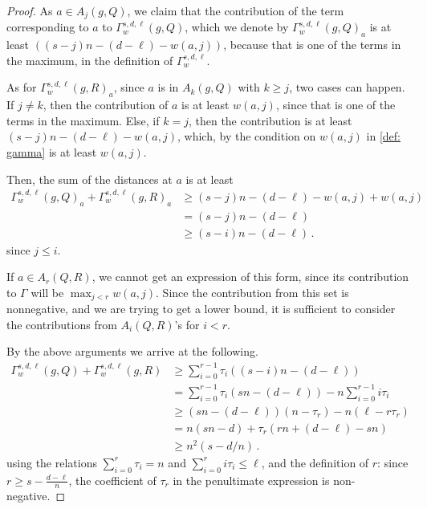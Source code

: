 \documentclass{theoretics}
\begin{document}
\begin{proof}
		As $a \in A_j(g, Q)$, we claim that the contribution of the term corresponding to $a$ to $\Gamma_w^{s,d,\ell}(g, Q)$, which we denote by $\Gamma_w^{s,d,\ell}(g, Q)_a$ is at least $\left((s-j)n - (d-\ell) - w(a, j)\right)$, because that is one of the terms in the maximum, in the definition of $\Gamma_w^{s,d,\ell}$.
		
		As for $\Gamma_w^{s,d,\ell}(g, R)_a$, since $a$ is in $A_k(g, Q)$ with $k \geq j$, two cases can happen. If $j \neq k$, then the contribution of $a$ is at least $w(a, j)$, since that is one of the terms in the maximum. Else, if $k = j$, then the contribution is at least $(s-j)n - (d-\ell) - w(a, j)$, which, by the condition on $w(a,j)$ in \cref{def: gamma} is at least $w(a,j)$.
		
		Then, the sum of the distances at $a$ is at least 
		\[ \begin{split}
			\Gamma_w^{s,d,\ell}(g, Q)_a + \Gamma_w^{s,d,\ell}(g, R)_a & \geq (s-j)n - (d-\ell) - w(a, j) + w(a, j) \\
			& = (s-j)n - (d-\ell) \\ 
			& \geq (s-i)n - (d-\ell) \, .
		\end{split} \]
		since $j \leq i$.
		
		If $a \in A_r(Q, R)$, we cannot get an expression of this form, since its contribution to $\Gamma$ will be $\max_{j < r} w(a, j)$. Since the contribution from this set is nonnegative, and we are trying to get a lower bound, it is sufficient to consider the contributions from $A_i(Q, R)$'s for $i < r$. 
		
		By the above arguments we arrive at the following.
		\[  
		\begin{split}
			\Gamma_w^{s,d,\ell}(g, Q) + \Gamma_w^{s,d,\ell}(g, R) & \geq \sum_{i=0}^{r-1} \tau_i ((s-i)n - (d-\ell))  \\
			& = \sum_{i=0}^{r-1} \tau_i (sn - (d-\ell)) -n \sum_{i=0}^{r-1} i \tau_i   \\
			& \geq (sn-(d-\ell))(n - \tau_r) -  n(\ell  - r \tau_r) \\
			& = n(sn-d) + \tau_r (rn + (d-\ell) - sn) \\
			& \geq n^2(s-d/n) \, .
		\end{split}
		\]
		using the relations $ \sum_{i=0}^r \tau_i = n$ and $ \sum_{i=0}^r i \tau_i \leq \ell$, and the definition of $r$: since $r \geq s - \frac{d-\ell}{n}$, the coefficient of $\tau_r$ in the penultimate expression is non-negative.
	\end{proof}
	
\end{document}
